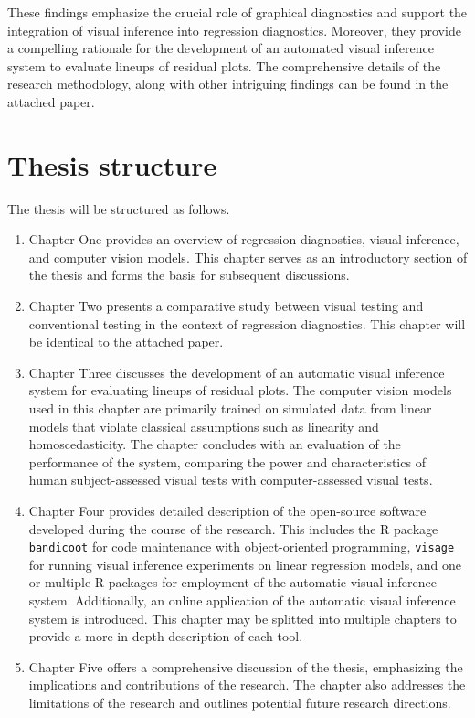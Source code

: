 \documentclass[11pt,a4paper,]{article}
\begin{document}
These findings emphasize the crucial role of graphical diagnostics and support the integration of visual inference into regression diagnostics. Moreover, they provide a compelling rationale for the development of an automated visual inference system to evaluate lineups of residual plots. The comprehensive details of the research methodology, along with other intriguing findings can be found in the attached paper.

\hypertarget{thesis-structure}{%
\section{Thesis structure}\label{thesis-structure}}

The thesis will be structured as follows.

\begin{enumerate}
\def\labelenumi{\arabic{enumi}.}
\item
  Chapter One provides an overview of regression diagnostics, visual inference, and computer vision models. This chapter serves as an introductory section of the thesis and forms the basis for subsequent discussions.
\item
  Chapter Two presents a comparative study between visual testing and conventional testing in the context of regression diagnostics. This chapter will be identical to the attached paper.
\item
  Chapter Three discusses the development of an automatic visual inference system for evaluating lineups of residual plots. The computer vision models used in this chapter are primarily trained on simulated data from linear models that violate classical assumptions such as linearity and homoscedasticity. The chapter concludes with an evaluation of the performance of the system, comparing the power and characteristics of human subject-assessed visual tests with computer-assessed visual tests.
\item
  Chapter Four provides detailed description of the open-source software developed during the course of the research. This includes the R package \texttt{bandicoot} for code maintenance with object-oriented programming, \texttt{visage} for running visual inference experiments on linear regression models, and one or multiple R packages for employment of the automatic visual inference system. Additionally, an online application of the automatic visual inference system is introduced. This chapter may be splitted into multiple chapters to provide a more in-depth description of each tool.
\item
  Chapter Five offers a comprehensive discussion of the thesis, emphasizing the implications and contributions of the research. The chapter also addresses the limitations of the research and outlines potential future research directions.
\end{enumerate}
\end{document}
